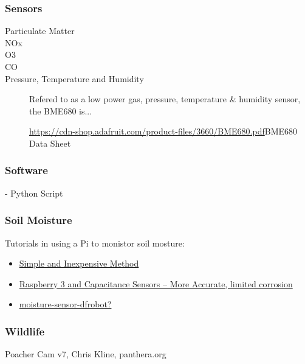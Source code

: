 \documentclass{article}\usepackage[]{graphicx}\usepackage[]{color}
\begin{document}
\subsubsection{Sensors}

\begin{description}

\item[Particulate Matter]

\item[NOx]

\item[O3]

\item[CO]

\item[Pressure, Temperature and Humidity]

Refered to as a low power gas, pressure, temperature \& humidity sensor, the BME680 is...

\href{BME680 Data Sheet}{https://cdn-shop.adafruit.com/product-files/3660/BME680.pdf}{BME680 Data Sheet}

\end{description}

\subsubsection{Software}

- Python Script

\subsubsection{Soil Moisture}

Tutorials in using a Pi to monistor soil mosture:

\begin{itemize}

\item \href{https://tutorials-raspberrypi.com/measuring-soil-moisture-with-raspberry-pi/}{Simple and Inexpensive Method}

\item \href{moisture-sensor-dfrobothttps://www.switchdoc.com/2018/11/tutorial-capacitive-moisture-sensor-grove/}{Raspberry 3 and Capacitance Sensors -- More Accurate, limited corrosion}

\item \href{https://tutorials-raspberrypi.com/raspberry-pi-capacitive-spoil-moisture-sensor-dfrobot-gravity/}{moisture-sensor-dfrobot?}
\end{itemize}

\subsubsection{Wildlife}

Poacher Cam v7, Chris Kline, panthera.org
\end{document}
